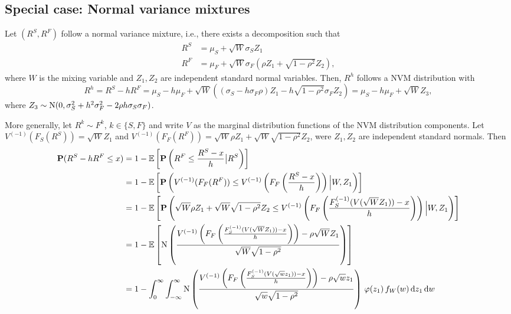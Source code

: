 \documentclass[square]{article} %
\theoremstyle{plain}
\theoremstyle{definition} %
\begin{document}
\subsection{Special case: Normal variance mixtures}
\label{sec:special-case:-normal}

Let $(R^S, R^F)$ follow a normal variance mixture, i.e., there exists a
decomposition such that
\begin{align*}
  R^S &=\mu_S + \sqrt{W} \sigma_S Z_1\\
  R^F &= \mu_F + \sqrt{W} \sigma_F (\rho Z_1 + \sqrt{1-\rho^2} Z_2),
\end{align*}
where $W$ is the mixing variable and $Z_1, Z_2$ are independent
standard normal variables. Then, $R^h$ follows a NVM distribution with
\begin{equation*}
  R^h = R^S - h R^F =  \mu_S - h \mu_F + \sqrt{W}
  \left((\sigma_S-h\sigma_F\rho)Z_1 -h \sqrt{1-\rho^2} 
    \sigma_F Z_2\right) = \mu_S - h \mu_F + \sqrt{W} Z_3,
\end{equation*}
where $Z_3\sim {\rm N}(0, \sigma_S^2 + h^2\sigma_F^2 - 2\rho
h\sigma_S \sigma_F)$. 

More generally, let $R^k\sim F^k$, $k\in \{S,F\}$ and write $V$
as the marginal distribution functions of the NVM distribution
components. Let $V^{(-1)}(F_S(R^S)) = \sqrt{W} Z_1$ and $V^{(-1)}(F_F(R^F)) =
\sqrt{W} \rho Z_1 + \sqrt{W} \sqrt{1-\rho^2} Z_2$, were $Z_1, Z_2$ are
independent standard normals. Then 
\begin{align*}
  \p(R^S-h R^F\leq x)
  &= 1-\E\left[ \p\left(R^F\leq \frac{R^S-x}{h}\big| R^S\right)\right] \\ %
  &= 1-\E\left[\p \left(V^{(-1)}(F_F(R^F)) \leq
    V^{(-1)}\left(F_F\left(\frac{R^S-x}{h}\right)\right) \Big|
    W, Z_1\right)\right] \\%
  &= 1-\E\left[ \p\left(\sqrt{W} \rho Z_1 + \sqrt{W} \sqrt{1-\rho^2}
    Z_2\leq V^{(-1)}\left(F_F\left(\frac{F_S^{(-1)}(V(\sqrt{W}
    Z_1))-x}{h}\right)\right) \Big| W, Z_1\right)\right]\\ %
  &= 1-\E\left[ \Ncdf \left(
    \frac{V^{(-1)}\left(F_F\left(\frac{F_S^{(-1)}(V(\sqrt{W}
    Z_1))-x}{h}\right)\right) -\rho \sqrt{W} Z_1} {
    \sqrt{W}\sqrt{1-\rho^2}}\right)\right]\\ 
  &= 1-\int_0^\infty \int_{-\infty}^{\infty} \Ncdf \left(
    \frac{V^{(-1)}\left(F_F\left(\frac{F_S^{(-1)}(V(\sqrt{w}
    z_1))-x}{h}\right)\right) -\rho\sqrt{w} z_1} { \sqrt{w}
    \sqrt{1-\rho^2}}\right) \, \varphi(z_1)\, f_W(w)\, \dd z_1\, \dd
    w%
\end{align*}
\end{document}
